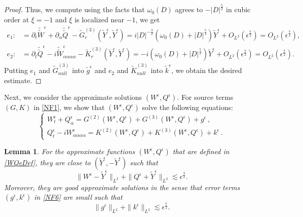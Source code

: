 \documentclass[12pt]{amsart}
\newtheorem{lemma}[theorem]{Lemma}
\theoremstyle{remark}
\theoremstyle{definition}
\numberwithin{equation}{section}
\newcommand{\e}{\epsilon}
\newcommand{\al}{\alpha}
\newcommand{\f}{\frac}
\begin{document}
\begin{proof}
Thus, we compute using the facts that $\omega_0(D)$ agrees to $-|D|^{\f52}$ in cubic order at $\xi = -1$ and $\xi$ is localized near $-1$, we get
\begin{align*}
e_1 :&= \partial_t \tilde{\tilde{W}}^\e+ \partial_\al\tilde{\tilde{Q}}^\e - \tilde{G}_{r}^{(3)} (\tilde{Y}^\e, \tilde{Y}^\e) = i|D|^{-\f32}(\omega_0 (D) +|D|^{\frac{5}{2}}) \tilde{Y}^\e + O_{L^2} (\epsilon^{\frac{7}{2}}) = O_{L^2} (\epsilon^{\frac{7}{2}}), \\
e_2 :&= \partial_t \tilde{\tilde{Q}}^\e-i \tilde{\tilde{W}}^\e_{\al \al \al \al} - \tilde{K}_{r}^{(3)} (\tilde{Y}^\e, \tilde{Y}^\e) = -i (\omega_0 (D) +|D|^{\frac{5}{2}}) \tilde{Y}^\e + O_{L^2} (\epsilon^{\frac{7}{2}}) = O_{L^2} (\epsilon^{\frac{7}{2}}).
\end{align*}
Putting $e_1$ and $\tilde{G}^{(3)}_{null}$ into $\tilde{g}^\epsilon$ and $e_2$ and $\tilde{K}^{(3)}_{null}$ into $\tilde{k}^\epsilon$, we obtain the desired estimate.
\end{proof}

Next, we consider the approximate solutions $(W^\epsilon, Q^\epsilon)$.
For source terms $(G, K)$ in \eqref{NF1}, we show that $(W^\epsilon, Q^\epsilon)$ solve the following equations:
\begin{equation}\label{NF6}
\begin{cases}		W^\epsilon_t+Q^\epsilon_{\al}=G^{(2)}(W^\epsilon, Q^\epsilon)+G^{(3)}(W^\epsilon, Q^\epsilon)+ g^\epsilon\,,\\
Q^\epsilon_t-iW^\epsilon_{\al\al\al\al}=K^{(2)}(W^\epsilon, Q^\epsilon)+K^{(3)}(W^\epsilon, Q^\epsilon) +k^\epsilon\,.
\end{cases}
\end{equation}

\begin{lemma}
For the approximate functions $(W^\epsilon, Q^\epsilon)$ that are defined in \eqref{WQeDef}, they are close to $(\tilde{Y}^\epsilon, - \tilde{Y}^\epsilon)$ such that
\begin{equation} \label{WQYEpsilondiff}
 \|W^\epsilon - \tilde{Y}^\epsilon\|_{L^2} + \|Q^\epsilon + \tilde{Y}^\epsilon\|_{L^2} \lesssim \epsilon^\f32.
\end{equation}
Moreover, they are good approximate solutions in the sense that error terms $(g^\epsilon,k^\epsilon)$ in \eqref{NF6} are small such that
\begin{equation*}
 \|g^\epsilon\|_{L^2} + \|k^\epsilon\|_{L^2} \lesssim \epsilon^{\f72}. 
\end{equation*}
\end{lemma}
\end{document}
